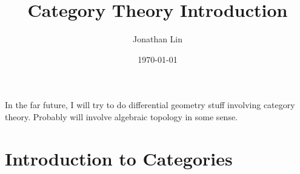 \documentclass[12pt]{article}
\title{Category Theory Introduction}
\author{Jonathan Lin}
\date{\today}
\theoremstyle{plain}
\theoremstyle{definition}
\begin{document}
\maketitle

In the far future, I will try to do differential geometry stuff involving category theory. Probably will involve algebraic topology in some sense.

\section{Introduction to Categories}
\end{document}
